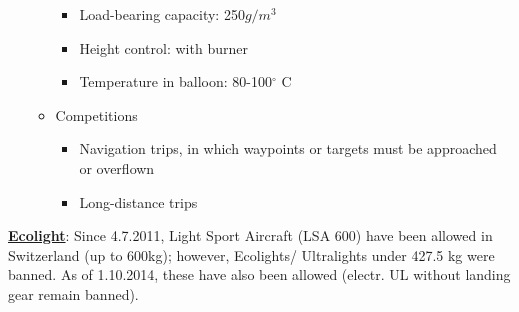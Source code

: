 \documentclass[9pt, landscape, fleqn]{scrartcl}
\begin{document}
\begin{multicols*}{3}
\begin{itemize}
\begin{itemize}
\begin{itemize}
           \item Load-bearing capacity: 250$g/m^3$
           \item Height control: with burner 
           \item Temperature in balloon: 80-100$^\circ$ C 
       \end{itemize}
       \item Competitions
       \begin{itemize}
           \item Navigation trips, in which waypoints or targets must be approached or overflown 
           \item Long-distance trips 
       \end{itemize}
   \end{itemize}
\end{itemize}
\underline{\textbf{Ecolight}}: Since 4.7.2011, Light Sport Aircraft (LSA 600) have been allowed in Switzerland (up to 600kg); however, Ecolights/ Ultralights under 427.5 kg were banned. As of 1.10.2014, these have also been allowed (electr. UL without landing gear remain banned).
\newpage

\end{multicols*}
\end{document}
